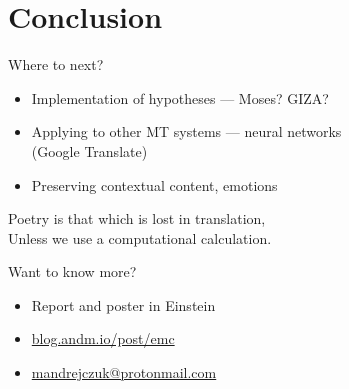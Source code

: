 \documentclass[notes]{beamer}
\newcommand{\quot}[2]{
    \begin{exampleblock}{}
      #1
      \vskip5mm
    \hspace*\fill{\small --- #2}
  \end{exampleblock}
}
\begin{document}
\section{Conclusion}
\begin{frame}{Where to next?}
  \begin{itemize}
  \item Implementation of hypotheses --- Moses? GIZA?
  \item Applying to other MT systems --- neural networks \\(Google Translate)
  \item Preserving contextual content, emotions
  \end{itemize}
\end{frame}
\begin{frame}
  \quot{Poetry is that which is lost in translation, \\ Unless we use
    a computational calculation.}{Soon?}
\end{frame}

\begin{frame}{Want to know more?}
  \begin{itemize}
  \item Report and poster in Einstein
  \item \url{blog.andm.io/post/emc}
  \item  \url{mandrejczuk@protonmail.com}
  \end{itemize}
\end{frame}
\end{document}
